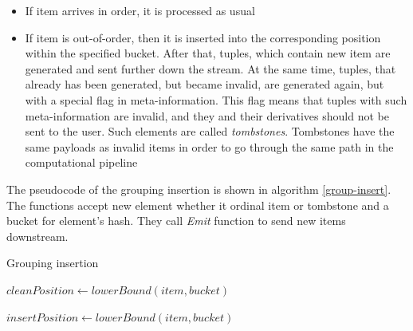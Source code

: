 \begin{itemize}
    \item If item arrives in order, it is processed as usual
    \item If item is out-of-order, then it is inserted into the corresponding position within the specified bucket. After that, tuples, which contain new item are generated and sent further down the stream. At the same time, tuples, that already has been generated, but became invalid, are generated again, but with a special flag in meta-information. This flag means that tuples with such meta-information are invalid, and they and their derivatives should not be sent to the user. Such elements are called {\it tombstones}. Tombstones have the same payloads as invalid items in order to go through the same path in the computational pipeline
\end{itemize}

The pseudocode of the grouping insertion is shown in algorithm \ref{group-insert}. The functions accept new element whether it ordinal item or tombstone and a bucket for element's hash. They call {\it Emit} function to send new items downstream.

\begin{algorithm*}
\caption{Grouping insertion}
\label{group-insert}
  \begin{algorithmic}[1]
      
      \State $cleanPosition \gets lowerBound(item, bucket)$
        \State {} 
      \EndFor

      \State {}

        \State {} 
      \EndFor
    \EndFunction

    \item[]

      \State $insertPosition \gets lowerBound(item, bucket)$
        \State {} 
      \EndFor
      
      \State {}

        \State {} 
      \EndFor
    \EndFunction
  \end{algorithmic}
\end{algorithm*}

